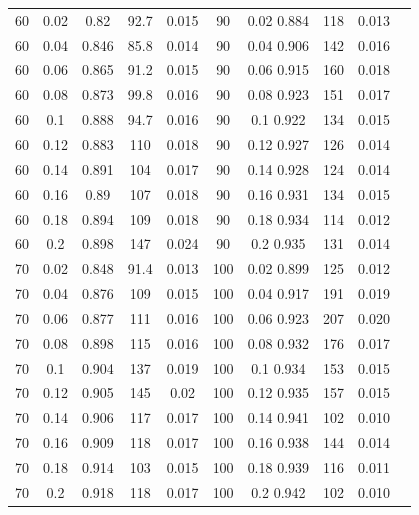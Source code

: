 \documentclass[12pt]{article}
\begin{document}
\begin{table}[h!]
\begin{tabular}{c c | c | c c ||c c | c | c c |}
			60	&	0.02	&	0.82	&	92.7	&	0.015	&	90	&	0.02	0.884	&	118	&	0.013\\ 
			60	&	0.04	&	0.846	&	85.8	&	0.014	&	90	&	0.04	0.906	&	142	&	0.016\\ 
			60	&	0.06	&	0.865	&	91.2	&	0.015	&	90	&	0.06	0.915	&	160	&	0.018\\ 
			60	&	0.08	&	0.873	&	99.8	&	0.016	&	90	&	0.08	0.923	&	151	&	0.017\\ 
			60	&	0.1	&	0.888	&	94.7	&	0.016	&	90	&	0.1	0.922	&	134	&	0.015\\ 
			60	&	0.12	&	0.883	&	110	&	0.018	&	90	&	0.12	0.927	&	126	&	0.014\\ 
			60	&	0.14	&	0.891	&	104	&	0.017	&	90	&	0.14	0.928	&	124	&	0.014\\ 
			60	&	0.16	&	0.89	&	107	&	0.018	&	90	&	0.16	0.931	&	134	&	0.015\\ 
			60	&	0.18	&	0.894	&	109	&	0.018	&	90	&	0.18	0.934	&	114	&	0.012\\ 
			60	&	0.2	&	0.898	&	147	&	0.024	&	90	&	0.2	0.935	&	131	&	0.014\\ 
			70	&	0.02	&	0.848	&	91.4	&	0.013	&	100	&	0.02	0.899	&	125	&	0.012\\ 
			70	&	0.04	&	0.876	&	109	&	0.015	&	100	&	0.04	0.917	&	191	&	0.019\\ 
			70	&	0.06	&	0.877	&	111	&	0.016	&	100	&	0.06	0.923	&	207	&	0.020\\ 
			70	&	0.08	&	0.898	&	115	&	0.016	&	100	&	0.08	0.932	&	176	&	0.017\\ 
			70	&	0.1	&	0.904	&	137	&	0.019	&	100	&	0.1	0.934	&	153	&	0.015\\ 
			70	&	0.12	&	0.905	&	145	&	0.02	&	100	&	0.12	0.935	&	157	&	0.015\\ 
			70	&	0.14	&	0.906	&	117	&	0.017	&	100	&	0.14	0.941	&	102	&	0.010\\ 
			70	&	0.16	&	0.909	&	118	&	0.017	&	100	&	0.16	0.938	&	144	&	0.014\\ 
			70	&	0.18	&	0.914	&	103	&	0.015	&	100	&	0.18	0.939	&	116	&	0.011\\ 
			70	&	0.2	&	0.918	&	118	&	0.017	&	100	&	0.2	0.942	&	102	&	0.010\\ 
			\hline
		\end{tabular}
		\end{table}
\end{document}
